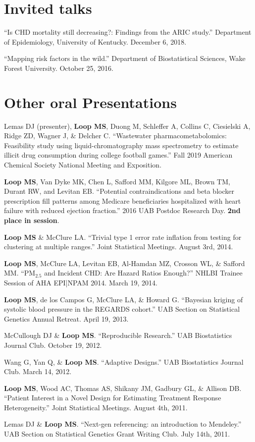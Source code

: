 \documentclass[10pt,letterpaper]{article}
\renewenvironment{itemize}{
  \begin{list}{}{
    \setlength{\leftmargin}{1.5em}
    \setlength{\itemsep}{0.25em}
    \setlength{\parskip}{0pt}
    \setlength{\parsep}{0.25em}
  }
}{
  \end{list}
}
\begin{document}
\section*{Invited talks}
\begin{itemize}
    \item ``Is CHD mortality still decreasing?: Findings from the ARIC study.'' Department of Epidemiology, University of Kentucky. December 6, 2018.
    \item ``Mapping risk factors in the wild.'' Department of Biostatistical Sciences, Wake Forest University. October 25, 2016.
\end{itemize}

\section*{Other oral Presentations}
\begin{itemize}
\item Lemas DJ (presenter), \textbf{Loop MS}, Duong M, Schleffer A, Collins C, Ciesielski A, Ridge ZD, Wagner J, \& Delcher C. ``Wastewater pharmacometabolomics: Feasibility study using liquid-chromatography mass spectrometry to estimate illicit drug consumption during college football games.'' Fall 2019 American Chemical Society National Meeting and Exposition.
	\item \textbf{Loop MS}, Van Dyke MK, Chen L, Safford MM, Kilgore ML, Brown TM, Durant RW, and Levitan EB. ``Potential contraindications and beta blocker prescription fill patterns among Medicare beneficiaries hospitalized with heart failure with reduced ejection fraction.'' 2016 UAB Postdoc Research Day. \textbf{2nd place in session}.
	\item \textbf{Loop MS} \& McClure LA. ``Trivial type 1 error rate inflation from testing for clustering at multiple ranges.'' Joint Statistical Meetings. August 3rd, 2014.
	\item \textbf{Loop MS}, McClure LA, Levitan EB, Al-Hamdan MZ, Crosson WL, \& Safford MM. ``PM$_{2.5}$ and Incident CHD: Are Hazard Ratios Enough?'' NHLBI Trainee Session of AHA EPI|NPAM 2014. March 19, 2014.
	\item \textbf{Loop MS}, de los Campos G, McClure LA, \& Howard G. ``Bayesian kriging of systolic blood pressure in the REGARDS cohort.'' UAB Section on Statistical Genetics Annual Retreat. April 19, 2013. 
	\item McCullough DJ \& \textbf{Loop MS}. ``Reproducible Research.'' UAB Biostatistics Journal Club. October 19, 2012.
	\item Wang G, Yan Q, \& \textbf{Loop MS}. ``Adaptive Designs.'' UAB Biostatistics Journal Club. March 14, 2012.
	\item \textbf{Loop MS}, Wood AC, Thomas AS, Shikany JM, Gadbury GL, \& Allison DB. ``Patient Interest in a Novel Design for Estimating Treatment Response Heterogeneity.'' Joint Statistical Meetings. August 4th, 2011.
	\item Lemas DJ \& \textbf{Loop MS}. ``Next-gen referencing: an introduction to Mendeley.'' UAB Section on Statistical Genetics Grant Writing Club. July 14th, 2011.
\end{itemize}
\end{document}
